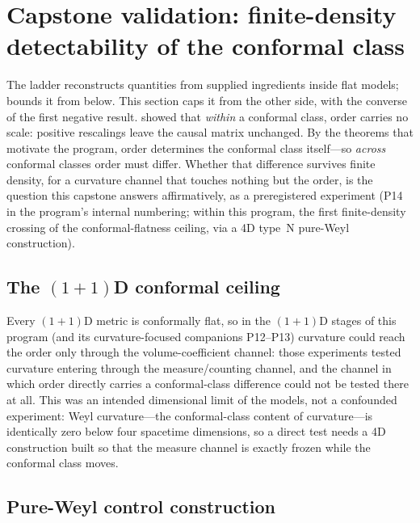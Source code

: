 
\section{Capstone validation: finite-density detectability of the conformal class}
\label{sec:capstone}

The ladder reconstructs quantities from supplied ingredients inside flat
models;  bounds it from below. This section caps it from
the other side, with the converse of the first negative result.
 showed that \emph{within} a conformal class, order carries no
scale: positive rescalings leave the causal matrix unchanged. By the theorems
that motivate the program, order determines the conformal class itself---so
\emph{across} conformal classes order must differ. Whether that difference
survives finite density, for a curvature channel that touches nothing but the
order, is the question this capstone answers affirmatively, as a
preregistered experiment (P14 in the program's internal numbering; within
this program, the first finite-density crossing of the conformal-flatness
ceiling, via a 4D type~N pure-Weyl construction).

\subsection{The \texorpdfstring{$(1{+}1)$D}{(1+1)D} conformal ceiling}
\label{sec:ceiling}

Every $(1{+}1)$D metric is conformally flat, so in the $(1{+}1)$D stages of
this program (and its curvature-focused companions P12--P13) curvature could
reach the order only through the volume-coefficient channel: those
experiments tested curvature entering through the measure/counting channel,
and the channel in which order directly carries a conformal-class difference
could not be tested there at all. This was an intended dimensional limit of
the models, not a confounded experiment: Weyl curvature---the conformal-class
content of curvature---is identically zero below four spacetime dimensions,
so a direct test needs a 4D construction built so that the measure channel is
exactly frozen while the conformal class moves.

\subsection{Pure-Weyl control construction}
\label{sec:pureweyl}

